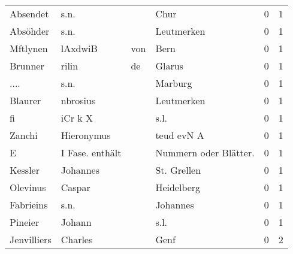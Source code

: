 \begin{tabular}{llllrr}
                 Absendet &                               s.n. &             &                                        Chur &          0 &         1 \\
                 Absöhder &                               s.n. &             &                                  Leutmerken &          0 &         1 \\
                 Mftlynen &                            lAxdwiB &         von &                                        Bern &          0 &         1 \\
                  Brunner &                              rilin &          de &                                      Glarus &          0 &         1 \\
                     .... &                               s.n. &             &                                     Marburg &          0 &         1 \\
                  Blaurer &                           nbrosius &             &                                  Leutmerken &          0 &         1 \\
                       fi &                            iCr k X &             &                                        s.l. &          0 &         1 \\
                   Zanchi &                         Hieronymus &             &                                  teud evN A &          0 &         1 \\
                        E &                    I Fase. enthält &             &                      Nummern oder Blätter.  &          0 &         1 \\
                  Kessler &                           Johannes &             &                                 St. Grellen &          0 &         1 \\
                 Olevinus &                             Caspar &             &                                  Heidelberg &          0 &         1 \\
                Fabrieins &                               s.n. &             &                                    Johannes &          0 &         1 \\
                  Pineier &                             Johann &             &                                        s.l. &          0 &         1 \\
              Jenvilliers &                            Charles &             &                                        Genf &          0 &         2 \\

\end{tabular}
